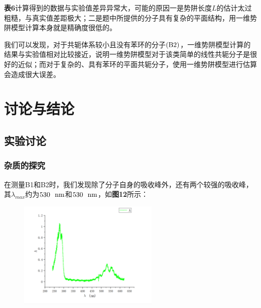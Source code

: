 \documentclass[12pt]{article}
\begin{document}
			\par
			\textbf{表6}计算得到的数据与实验值差异异常大，可能的原因一是势阱长度$L$的估计太过粗糙，与真实值差距极大；二是题中所提供的分子具有复杂的平面结构，用一维势阱模型计算本身就是精确度很低的。\par
			我们可以发现，对于共轭体系较小且没有苯环的分子$\rm (B2)$，一维势阱模型计算的结果与实验值相对比较接近，说明一维势阱模型对于该类简单的线性共轭分子是很好的近似；而对于复杂的、具有苯环的平面共轭分子，使用一维势阱模型进行估算会造成很大误差。
			
			
				\section{讨论与结论}
					\subsection{实验讨论}
					\subsubsection{杂质的探究}
					在测量B1和B2时，我们发现除了分子自身的吸收峰外，还有两个较强的吸收峰，其$\lambda_{max}$约为$530\ \ {\rm nm}$和$530\ \ {\rm nm}$，如\textbf{图12}所示：\par
					\begin{figure}[h]
						\centering
						\includegraphics[width=0.6\textwidth]{11.png}
					\end{figure}
					
\end{document}
